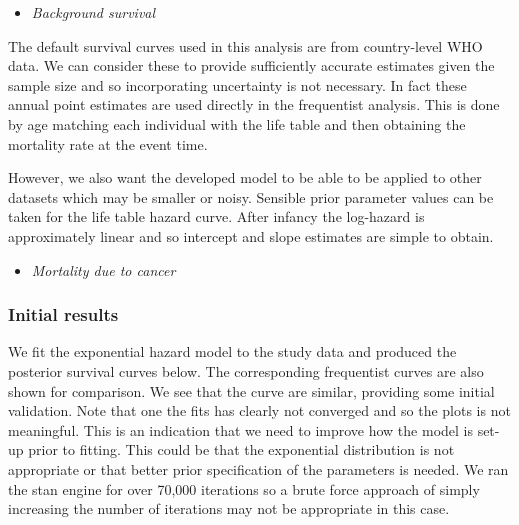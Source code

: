 \documentclass[
]{article}
\providecommand{\tightlist}{%
  \setlength{\itemsep}{0pt}\setlength{\parskip}{0pt}}
\begin{document}
\begin{itemize}
\tightlist
\item
  \emph{Background survival}
\end{itemize}

The default survival curves used in this analysis are from country-level
WHO data. We can consider these to provide sufficiently accurate
estimates given the sample size and so incorporating uncertainty is not
necessary. In fact these annual point estimates are used directly in the
frequentist analysis. This is done by age matching each individual with
the life table and then obtaining the mortality rate at the event time.

However, we also want the developed model to be able to be applied to
other datasets which may be smaller or noisy. Sensible prior parameter
values can be taken for the life table hazard curve. After infancy the
log-hazard is approximately linear and so intercept and slope estimates
are simple to obtain.

\begin{itemize}
\tightlist
\item
  \emph{Mortality due to cancer}
\end{itemize}

\hypertarget{initial-results}{%
\subsubsection{Initial results}\label{initial-results}}

We fit the exponential hazard model to the study data and produced the
posterior survival curves below. The corresponding frequentist curves
are also shown for comparison. We see that the curve are similar,
providing some initial validation. Note that one the fits has clearly
not converged and so the plots is not meaningful. This is an indication
that we need to improve how the model is set-up prior to fitting. This
could be that the exponential distribution is not appropriate or that
better prior specification of the parameters is needed. We ran the stan
engine for over 70,000 iterations so a brute force approach of simply
increasing the number of iterations may not be appropriate in this case.
\end{document}
